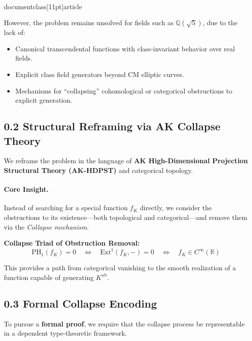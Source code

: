 \\documentclass[11pt]{article}
\begin{document}
However, the problem remains unsolved for fields such as \( \mathbb{Q}(\sqrt{5}) \), due to the lack of:
\begin{itemize}
    \item Canonical transcendental functions with class-invariant behavior over real fields.
    \item Explicit class field generators beyond CM elliptic curves.
    \item Mechanisms for “collapsing” cohomological or categorical obstructions to explicit generation.
\end{itemize}

\subsection*{0.2 Structural Reframing via AK Collapse Theory}

We reframe the problem in the language of \textbf{AK High-Dimensional Projection Structural Theory (AK-HDPST)} and categorical topology.

\paragraph{Core Insight.}  
Instead of searching for a special function \( f_K \) directly, we consider the obstructions to its existence—both topological and categorical—and remove them via the \emph{Collapse mechanism}.

\vspace{1em}
\textbf{Collapse Triad of Obstruction Removal:}
\[
\boxed{
\mathrm{PH}_1(f_K) = 0 \quad \Leftrightarrow \quad \mathrm{Ext}^1(f_K, -) = 0 \quad \Leftrightarrow \quad f_K \in C^\infty(\mathbb{R})
}
\]

This provides a path from categorical vanishing to the smooth realization of a function capable of generating \( K^{\mathrm{ab}} \).

\subsection*{0.3 Formal Collapse Encoding}

To pursue a \textbf{formal proof}, we require that the collapse process be representable in a dependent type-theoretic framework.
\end{document}
